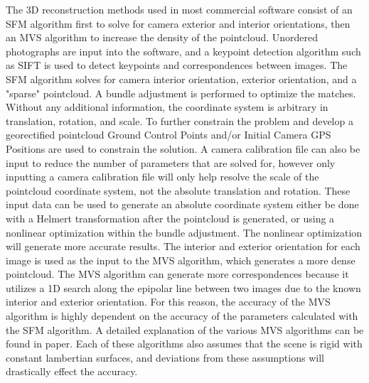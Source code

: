 The 3D reconstruction methods used in most commercial software consist of an SFM algorithm first to solve for camera exterior and interior orientations, then an MVS algorithm to increase the density of the pointcloud.  Unordered photographs are input into the software, and a keypoint detection algorithm such as SIFT is used to detect keypoints and correspondences between images.  The SFM algorithm solves for camera interior orientation, exterior orientation, and a "sparse" pointcloud.  A bundle adjustment is performed to optimize the matches.  Without any additional information, the coordinate system is arbitrary in translation, rotation, and scale.  To further constrain the problem and develop a georectified pointcloud Ground Control Points and/or Initial Camera GPS Positions are used to constrain the solution.  A camera calibration file can also be input to reduce the number of parameters that are solved for, however only inputting a camera calibration file will only help resolve the scale of the pointcloud coordinate system, not the absolute translation and rotation.  These input data can be used to generate an absolute coordinate system either be done with a Helmert transformation after the pointcloud is generated,  or using a nonlinear optimization within the bundle adjustment.  The nonlinear optimization will generate more accurate results.  The interior and exterior orientation for each image is used as the input to the MVS algorithm, which generates a more dense pointcloud.  The MVS algorithm can generate more correspondences because it utilizes a 1D search along the epipolar line between two images due to the known interior and exterior orientation.  For this reason, the accuracy of the MVS algorithm is highly dependent on the accuracy of the parameters calculated with the SFM algorithm.  A detailed explanation of the various MVS algorithms can be found in paper.  Each of these algorithms also assumes that the scene is rigid with constant lambertian surfaces, and deviations from these assumptions will drastically effect the accuracy. 

